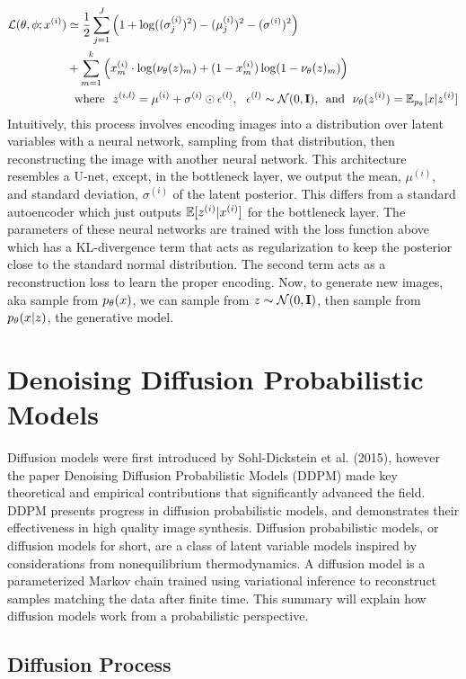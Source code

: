\documentclass{article}
\begin{document}
\begin{align}
    \mathcal{L}(\theta,\phi;x^{(i)}) & \simeq \frac{1}{2}\sum_{j=1}^J\left(  1 + \log((\sigma_j^{(i)})^2)-(\mu_j^{(i)})^2 - (\sigma^{(i)})^2\right) \\ & + \sum_{m=1}^k \left( x^{(i)}_m \cdot \log(\nu_\theta(z)_m) + (1 - x^{(i)}_m) \log(1- \nu_\theta(z)_m) \right) \notag \\
    &\text{~~where~~} z^{(i,l)} = \mu^{(i)} + \sigma^{(i)} \odot \epsilon^{(l)}, ~~ \epsilon^{(l)}\sim\mathcal{N}(0,\mathbf{I}) \text{,~~and~~} \nu_\theta(z^{(i)}) = \mathbb{E}_{p_\theta}[x|z^{(i)}]\notag
\end{align}Intuitively, this process involves encoding images into a distribution over latent variables with a neural network, sampling from that distribution, then reconstructing the image with another neural network. This architecture resembles a U-net, except, in the bottleneck layer, we output the mean, $\mu^{(i)}$, and standard deviation, $\sigma^{(i)}$ of the latent posterior. This differs from a standard autoencoder which just outputs $\mathbb{E}[z^{(i)}|x^{(i)}]$ for the bottleneck layer. The parameters of these neural networks are trained with the loss function above which has a KL-divergence term that acts as regularization to keep the posterior close to the standard normal distribution. The second term acts as a reconstruction loss to learn the proper encoding. Now, to generate new images, aka sample from $p_\theta(x)$, we can sample from $z \sim \mathcal{N}(0,\mathbf{I})$, then sample from $p_\theta(x|z)$, the generative model.

\section{Denoising Diffusion Probabilistic Models}
Diffusion models were first introduced by Sohl-Dickstein et al. (2015), however the paper Denoising Diffusion Probabilistic Models (DDPM) made key theoretical and empirical contributions that significantly advanced the field. DDPM presents progress in diffusion probabilistic models, and demonstrates their effectiveness in high quality image synthesis. Diffusion probabilistic models, or diffusion models for short, are a class of latent variable models inspired by considerations from nonequilibrium thermodynamics. A diffusion model is a parameterized Markov chain trained using variational inference to reconstruct samples matching the data after finite time. This summary will explain how diffusion models work from a probabilistic perspective.

\subsection{Diffusion Process}
\end{document}
